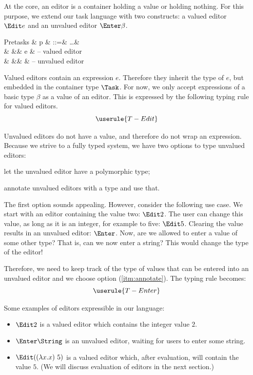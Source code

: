 At the core,
an editor is a container holding a value
or holding nothing.
For this purpose, we extend our task language with two constructs:
a valued editor $\Edit e$ and an unvalued editor $\Enter \beta$.
\begin{grammar}
  Pretasks
    & p & ::=& \ldots       & \\
    &   &\mid& \Edit e      & – valued editor \\
    &   &\mid& \Enter \beta & – unvalued editor \\
\end{grammar}

Valued editors contain an expression $e$.
Therefore they inherit the type of $e$,
but embedded in the container type $\Task$.
For now, we only accept expressions of a basic type $\beta$ as a value of an editor.
This is expressed by the following typing rule for valued editors.
\begin{equation*}
  \userule{T-Edit}
\end{equation*}

Unvalued editors do not have a value,
and therefore do not wrap an expression.
Because we strive to a fully typed system,
we have two options to type unvalued editors:
\begin{enumerate*}
  \item let the unvalued editor have a polymorphic type;
  \item annotate unvalued editors with a type and use that. \label{itm:annotate}
\end{enumerate*}

The first option sounds appealing.
However, consider the following use case.
We start with an editor containing the value two: $\Edit 2$.
The user can change this value, as long as it is an integer,
for example to five: $\Edit 5$.
Clearing the value results in an unvalued editor: $\Enter$.
Now, are we allowed to enter a value of some other type?
That is, can we now enter a string?
This would change the type of the editor!

Therefore,
we need to keep track of the type of values that can be entered into an unvalued editor
and we choose option (\ref{itm:annotate}).
The typing rule becomes:
\begin{equation*}
  \userule{T-Enter}
\end{equation*}

Some examples of editors expressible in our language:
\begin{itemize}
  \item $\Edit 2$ is a valued editor which contains the integer value $2$.
  \item $\Enter \String$ is an unvalued editor,
    waiting for users to enter some string.
  \item $\Edit ((\lambda x . x)\ 5)$ is a valued editor which,
    after evaluation, will contain the value $5$.
    (We will discuss evaluation of editors in the next section.)
\end{itemize}


